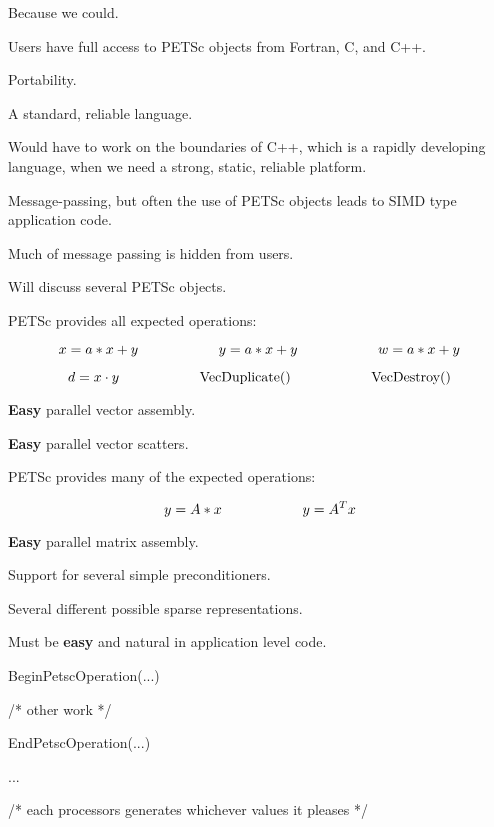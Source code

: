 Because we could.

Users have full access to PETSc objects from Fortran, C, and C++.

Portability. 

A standard, reliable language.

Would have to work on the boundaries of C++, which is 
a rapidly developing language, when we need a strong, 
static, reliable platform.
\ve

Message-passing, but often the use of PETSc objects 
leads to SIMD type application code.

Much of message passing is hidden from users.

Will discuss several PETSc objects.
\ve


PETSc provides all expected operations:

\[
x = a*x + y \hspace{.8in} y = a*x + y \hspace{.8in} w = a*x + y
\]

\[
d = x \cdot y \hspace{.8in} \hbox{VecDuplicate()} \hspace{.8in} 
   \hbox{VecDestroy()}
\]

{\bf Easy} parallel vector assembly.

{\bf Easy} parallel vector scatters.

\ve

PETSc provides many of the expected operations:

\[
y = A *x \hspace{.8in} y = A^{T} x
\]

{\bf Easy} parallel matrix assembly. 

Support for several simple preconditioners.

Several different possible sparse representations.
\ve


Must be {\bf easy} and natural in application level code.

BeginPetscOperation(...)

/* other work */

EndPetscOperation(...)

\ve

...

/* each processors generates whichever values it pleases */

